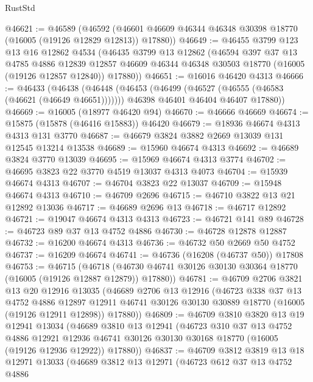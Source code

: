 \begin{lexlean}{RustStd}
\begin{coremodule}
@46621 := @46589
    (@46592 (@46601 @46609 @46344 @46348 @30398 @18770 (@16005 (@19126 @12829 @12813)) @17880))
@46649 := @46455
    @3799
    @123
    @13
    @16
    @12862
    @4534
    (@46435
      @3799
      @13
      @12862
      (@46594
        @397
        @37
        @13
        @4785
        @4886
        @12839
        @12857
        @46609
        @46344
        @46348
        @30503
        @18770
        (@16005 (@19126 @12857 @12840))
        @17880))
@46651 := @16016 @46420 @4313
@46666 := @46433
    (@46438
      (@46448
        (@46453 (@46499 (@46527 (@46555 (@46583 (@46621 (@46649 @46651)))))))
        @46398
        @46401
        @46404
        @46407
        @17880))
@46669 := @16005 (@18977 @46420 @94)
@46670 := @46666 @46669
@46674 := @15875 (@15878 (@46416 @15883)) @46420
@46679 := @18936 @46674 @4313 @4313 @131 @3770
@46687 := @46679 @3824 @3882 @2669 @13039 @131 @12545 @13214 @13538
@46689 := @15960 @46674 @4313
@46692 := @46689 @3824 @3770 @13039
@46695 := @15969 @46674 @4313 @3774
@46702 := @46695 @3823 @22 @3770 @4519 @13037 @4313 @4073
@46704 := @15939 @46674 @4313
@46707 := @46704 @3823 @22 @13037
@46709 := @15948 @46674 @4313
@46710 := @46709 @2696
@46715 := @46710 @3822 @13 @21 @12892 @13036
@46717 := @46689 @2696 @13
@46718 := @46717 @12892
@46721 := @19047 @46674 @4313 @4313
@46723 := @46721 @141 @89
@46728 := @46723 @89 @37 @13 @4752 @4886
@46730 := @46728 @12878 @12887
@46732 := @16200 @46674 @4313
@46736 := @46732 @50 @2669 @50 @4752
@46737 := @16209 @46674
@46741 := @46736 (@16208 (@46737 @50)) @17808
@46753 := @46715
    (@46718 (@46730 @46741 @30126 @30130 @30364 @18770 (@16005 (@19126 @12887 @12879)) @17880))
@46781 := @46709
    @2706
    @3821
    @13
    @20
    @12916
    @13035
    (@46689
      @2706
      @13
      @12916
      (@46723
        @338
        @37
        @13
        @4752
        @4886
        @12897
        @12911
        @46741
        @30126
        @30130
        @30889
        @18770
        (@16005 (@19126 @12911 @12898))
        @17880))
@46809 := @46709
    @3810
    @3820
    @13
    @19
    @12941
    @13034
    (@46689
      @3810
      @13
      @12941
      (@46723
        @310
        @37
        @13
        @4752
        @4886
        @12921
        @12936
        @46741
        @30126
        @30130
        @30168
        @18770
        (@16005 (@19126 @12936 @12922))
        @17880))
@46837 := @46709
    @3812
    @3819
    @13
    @18
    @12971
    @13033
    (@46689
      @3812
      @13
      @12971
      (@46723
        @612
        @37
        @13
        @4752
        @4886

\end{coremodule}
\end{lexlean}
